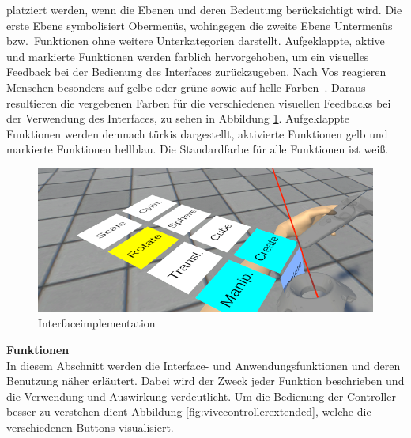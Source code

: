 platziert werden, wenn die Ebenen und deren Bedeutung berücksichtigt wird. Die erste Ebene symbolisiert Obermenüs, wohingegen die zweite Ebene Untermenüs bzw.~Funktionen ohne weitere Unterkategorien darstellt. Aufgeklappte, aktive und markierte Funktionen werden farblich hervorgehoben, um ein visuelles Feedback bei der Bedienung des Interfaces zurückzugeben. Nach Vos reagieren Menschen besonders auf gelbe oder grüne sowie auf helle Farben~\citep{colors}. Daraus resultieren die vergebenen Farben für die verschiedenen visuellen Feedbacks bei der Verwendung des Interfaces, zu sehen in Abbildung \ref{fig:interfaceimp}. Aufgeklappte Funktionen werden demnach türkis dargestellt, aktivierte Funktionen gelb und markierte Funktionen hellblau. Die Standardfarbe für alle Funktionen ist weiß.

\begin{figure}[h]
\captionsetup{width=.7\linewidth}
\includegraphics[scale=0.6]{Bilder/Hauptteil/Bearbeitet/Interface}
\centering
\caption{Interfaceimplementation}
\label{fig:interfaceimp}
\end{figure}


\noindent \textbf{Funktionen}\\
In diesem Abschnitt werden die Interface- und Anwendungsfunktionen und deren Benutzung näher erläutert. Dabei wird der Zweck jeder Funktion beschrieben und die Verwendung und Auswirkung verdeutlicht. Um die Bedienung der Controller besser zu verstehen dient Abbildung \ref{fig:vivecontrollerextended}, welche die verschiedenen Buttons visualisiert.

